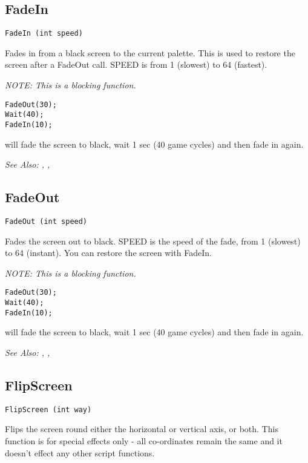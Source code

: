 \subsection{FadeIn}\label{FadeIn}%

\begin{verbatim}
FadeIn (int speed)
\end{verbatim}
Fades in from a black screen to the current palette. This is used to restore
the screen after a FadeOut call. SPEED is from 1 (slowest) to 64 (fastest).

\it{NOTE: This is a blocking function.}

\begin{verbatim}
FadeOut(30);
Wait(40);
FadeIn(10);
\end{verbatim}
will fade the screen to black, wait 1 sec (40 game cycles) and then fade in again.

\it{See Also:} , ,


\subsection{FadeOut}\label{FadeOut}%

\begin{verbatim}
FadeOut (int speed)
\end{verbatim}
Fades the screen out to black. SPEED is the speed of the fade, from 1
(slowest) to 64 (instant). You can restore the screen with FadeIn.

\it{NOTE: This is a blocking function.}

\begin{verbatim}
FadeOut(30);
Wait(40);
FadeIn(10);
\end{verbatim}
will fade the screen to black, wait 1 sec (40 game cycles) and then fade in again.

\it{See Also:} , ,


\subsection{FlipScreen}\label{FlipScreen}%

\begin{verbatim}
FlipScreen (int way)
\end{verbatim}
Flips the screen round either the horizontal or vertical axis, or both.
This function is for special effects only - all co-ordinates remain the
same and it doesn't effect any other script functions.

